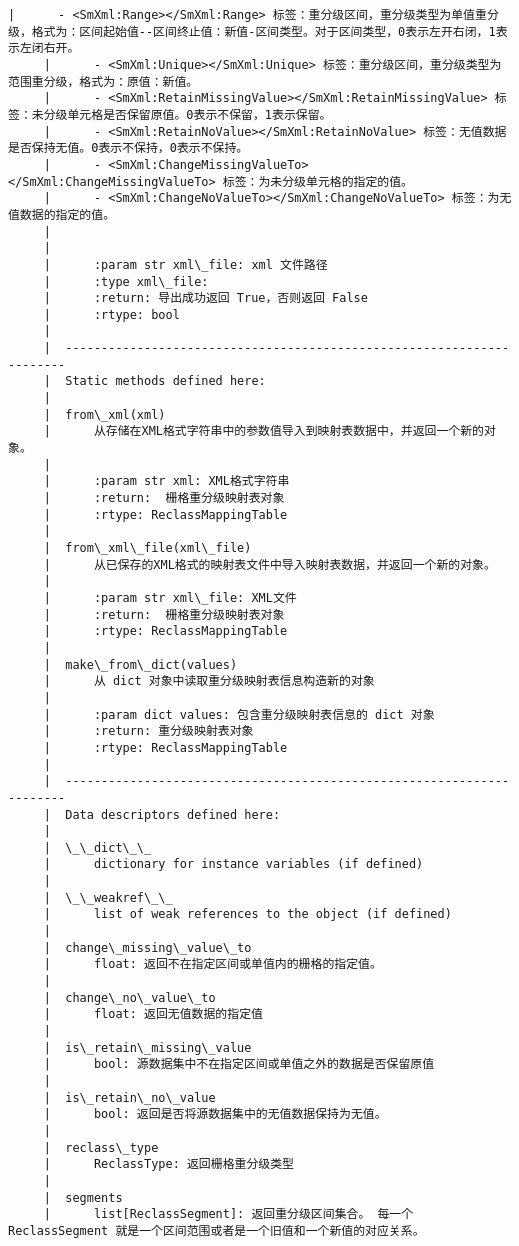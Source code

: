 \documentclass[11pt]{article}
\begin{document}
\begin{Verbatim}[commandchars=\\\{\}]
     |      - <SmXml:Range></SmXml:Range> 标签：重分级区间，重分级类型为单值重分级，格式为：区间起始值--区间终止值：新值-区间类型。对于区间类型，0表示左开右闭，1表示左闭右开。
     |      - <SmXml:Unique></SmXml:Unique> 标签：重分级区间，重分级类型为范围重分级，格式为：原值：新值。
     |      - <SmXml:RetainMissingValue></SmXml:RetainMissingValue> 标签：未分级单元格是否保留原值。0表示不保留，1表示保留。
     |      - <SmXml:RetainNoValue></SmXml:RetainNoValue> 标签：无值数据是否保持无值。0表示不保持，0表示不保持。
     |      - <SmXml:ChangeMissingValueTo></SmXml:ChangeMissingValueTo> 标签：为未分级单元格的指定的值。
     |      - <SmXml:ChangeNoValueTo></SmXml:ChangeNoValueTo> 标签：为无值数据的指定的值。
     |      
     |      
     |      :param str xml\_file: xml 文件路径
     |      :type xml\_file:
     |      :return: 导出成功返回 True，否则返回 False
     |      :rtype: bool
     |  
     |  ----------------------------------------------------------------------
     |  Static methods defined here:
     |  
     |  from\_xml(xml)
     |      从存储在XML格式字符串中的参数值导入到映射表数据中，并返回一个新的对象。
     |      
     |      :param str xml: XML格式字符串
     |      :return:  栅格重分级映射表对象
     |      :rtype: ReclassMappingTable
     |  
     |  from\_xml\_file(xml\_file)
     |      从已保存的XML格式的映射表文件中导入映射表数据，并返回一个新的对象。
     |      
     |      :param str xml\_file: XML文件
     |      :return:  栅格重分级映射表对象
     |      :rtype: ReclassMappingTable
     |  
     |  make\_from\_dict(values)
     |      从 dict 对象中读取重分级映射表信息构造新的对象
     |      
     |      :param dict values: 包含重分级映射表信息的 dict 对象
     |      :return: 重分级映射表对象
     |      :rtype: ReclassMappingTable
     |  
     |  ----------------------------------------------------------------------
     |  Data descriptors defined here:
     |  
     |  \_\_dict\_\_
     |      dictionary for instance variables (if defined)
     |  
     |  \_\_weakref\_\_
     |      list of weak references to the object (if defined)
     |  
     |  change\_missing\_value\_to
     |      float: 返回不在指定区间或单值内的栅格的指定值。
     |  
     |  change\_no\_value\_to
     |      float: 返回无值数据的指定值
     |  
     |  is\_retain\_missing\_value
     |      bool: 源数据集中不在指定区间或单值之外的数据是否保留原值
     |  
     |  is\_retain\_no\_value
     |      bool: 返回是否将源数据集中的无值数据保持为无值。
     |  
     |  reclass\_type
     |      ReclassType: 返回栅格重分级类型
     |  
     |  segments
     |      list[ReclassSegment]: 返回重分级区间集合。 每一个 ReclassSegment 就是一个区间范围或者是一个旧值和一个新值的对应关系。
    

\end{Verbatim}
\end{document}
